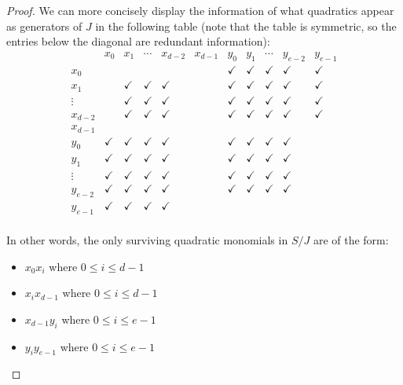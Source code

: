 \documentclass[12pt,reqno]{amsart}
\theoremstyle{definition}
\theoremstyle{remark}
\begin{document}
\begin{proof}
We can more concisely display the information of what quadratics appear as generators of $J$ in the following table (note that the table is symmetric, so the entries below the diagonal are redundant information): 
\[
\begin{array}{c|c|c|c|c|c||c|c|c|c|c}
& x_0 & x_1 & \cdots & x_{d-2} & x_{d-1} & y_0 & y_1 & \cdots & y_{e-2} & y_{e-1} \\ 
\hline 
x_0 & & & & & & \checkmark & \checkmark & \checkmark & \checkmark & \checkmark \\
\hline 
x_1 & & \checkmark & \checkmark & \checkmark & & \checkmark & \checkmark & \checkmark & \checkmark & \checkmark \\ 
\hline 
\vdots & & \checkmark & \checkmark & \checkmark & & \checkmark & \checkmark & \checkmark & \checkmark & \checkmark \\
\hline 
x_{d-2} & & \checkmark & \checkmark & \checkmark & & \checkmark & \checkmark & \checkmark & \checkmark & \checkmark \\
\hline 
x_{d-1} & & & & & & & & & & \\
\hline 
\hline 
y_0 & \checkmark & \checkmark & \checkmark & \checkmark & & \checkmark & \checkmark & \checkmark & \checkmark & \\
\hline 
y_1 & \checkmark & \checkmark & \checkmark & \checkmark & & \checkmark & \checkmark & \checkmark & \checkmark & \\ 
\hline 
\vdots & \checkmark & \checkmark & \checkmark & \checkmark & & \checkmark & \checkmark & \checkmark & \checkmark & \\
\hline 
y_{e-2} & \checkmark & \checkmark & \checkmark & \checkmark & & \checkmark & \checkmark & \checkmark & \checkmark & \\
\hline 
y_{e-1} & \checkmark & \checkmark & \checkmark & \checkmark & & & & & \\
\end{array}
\]

\newpage
In other words, the only surviving quadratic monomials in $S/J$ are of the form: 
\begin{itemize}
    \item $x_0x_i$ where $0 \leq i \leq d-1$
    \item $x_ix_{d-1}$ where $0 \leq i \leq d-1$ 
    \item $x_{d-1}y_i$ where $0 \leq i \leq e-1$
    \item $y_i y_{e-1}$ where $0 \leq i \leq e-1$
\end{itemize}


\end{proof}
\end{document}
